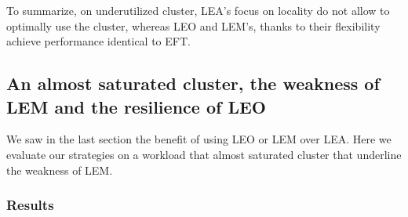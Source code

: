 \documentclass[conference,10pt]{IEEEtran}
\begin{document}
To summarize, on underutilized cluster, LEA's focus on locality
do not allow to optimally use the cluster, whereas LEO and LEM's, thanks to their flexibility
achieve performance identical to EFT.

\subsection{An almost saturated cluster, the weakness of LEM and the resilience of LEO}\label{sec.09-09}

We saw in the last section the benefit of using LEO or LEM over LEA.
Here we evaluate our strategies on a workload that almost saturated cluster that underline the weakness of LEM.

\subsubsection{Results}
\end{document}
